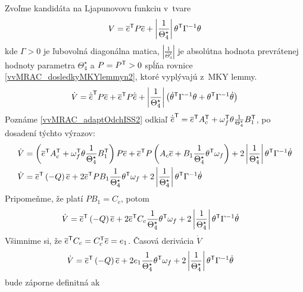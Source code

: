 \documentclass[a4paper, 10pt, ]{article}
\begin{document}
Zvoľme kandidáta na Ljapunovovu funkciu v~tvare
\begin{equation}
	V = \overline{e}^{\mathsf{T}} P \overline{e} + \left| \frac{1}{\Theta_4^\star} \right| \theta^{\mathsf{T}} \Gamma^{-1} \theta
\end{equation}
kde $\Gamma > 0$ je ľubovolná diagonálna matica, $\left| \frac{1}{\Theta_4^\star} \right|$ je absolútna hodnota prevrátenej hodnoty parametra $\Theta_4^\star$ a $P = P^{\mathsf{T}}>0$ spĺňa rovnice \eqref{vvMRAC_dosledkyMKYlemmyn2}, ktoré vyplývajú z~MKY lemmy.
\begin{equation}
	\dot{V} = \dot{\overline{e}}^{\mathsf{T}} P \overline{e} + \overline{e}^{\mathsf{T}} P \dot{\overline{e}} + \left| \frac{1}{\Theta_4^\star} \right| \left( \dot{\theta}^{\mathsf{T}} \Gamma^{-1} \theta + \theta^{\mathsf{T}} \Gamma^{-1} \dot{\theta} \right)
\end{equation}
Poznáme \eqref{vvMRAC_adaptOdchISS2} odkiaľ $ \dot{\overline{e}}^{\mathsf{T}} = \overline{e}^{\mathsf{T}} A_c^{\mathsf{T}} + \omega_f^{\mathsf{T}} \theta \frac{1}{\Theta_4^\star} B_1^{\mathsf{T}} $, po dosadení týchto výrazov:
\begin{align}
    \dot{V} &= \left( \overline{e}^{\mathsf{T}} A_c^{\mathsf{T}} + \omega_f^{\mathsf{T}} \theta \frac{1}{\Theta_4^\star} B_1^{\mathsf{T}} \right) P \overline{e} + \overline{e}^{\mathsf{T}} P \left( A_c \overline{e} + B_1 \frac{1}{\Theta_4^\star} \theta^{\mathsf{T}} \omega_f \right) + 2 \left| \frac{1}{\Theta_4^\star} \right| \theta^{\mathsf{T}} \Gamma^{-1} \dot \theta \\
	\dot{V} &= \overline{e}^{\mathsf{T}} \left( - Q \right) \overline{e} + 2 \overline{e}^{\mathsf{T}} P B_1 \frac{1}{\Theta_4^\star} \theta^{\mathsf{T}} \omega_f + 2 \left| \frac{1}{\Theta_4^\star} \right| \theta^{\mathsf{T}} \Gamma^{-1} \dot \theta
\end{align}
Pripomeňme, že platí $P B_1 = {C_c}$, potom
\begin{align}
    \dot{V} &= \overline{e}^{\mathsf{T}} \left( - Q \right) \overline{e} + 2 \overline{e}^{\mathsf{T}} C_c \frac{1}{\Theta_4^\star} \theta^{\mathsf{T}} \omega_f + 2 \left| \frac{1}{\Theta_4^\star} \right| \theta^{\mathsf{T}} \Gamma^{-1} \dot \theta
\end{align}
Všimnime si, že $\overline{e}^{\mathsf{T}} C_c = C_c^{\mathsf{T}} \overline{e} = e_1$.
Časová derivácia $\dot{V}$
\begin{align}
	\dot{V} &= \overline{e}^{\mathsf{T}} \left( - Q \right) \overline{e} + 2 e_1 \frac{1}{\Theta_4^\star} \theta^{\mathsf{T}} \omega_f + 2 \left| \frac{1}{\Theta_4^\star} \right| \theta^{\mathsf{T}} \Gamma^{-1} \dot\theta
\end{align}
bude záporne definitná ak
\end{document}
